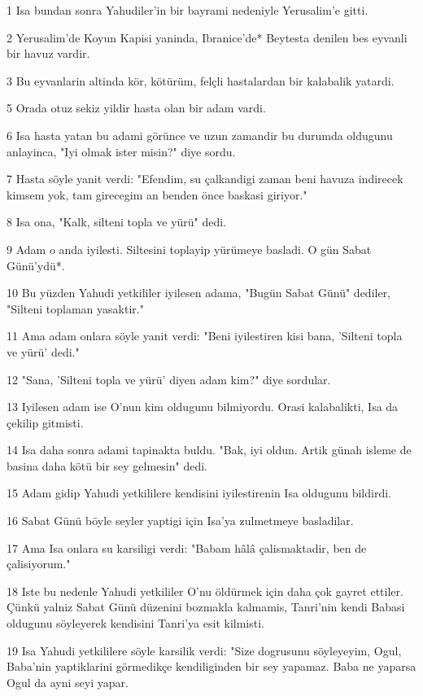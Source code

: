 \par 1 Isa bundan sonra Yahudiler'in bir bayrami nedeniyle Yerusalim'e gitti.
\par 2 Yerusalim'de Koyun Kapisi yaninda, Ibranice'de* Beytesta denilen bes eyvanli bir havuz vardir.
\par 3 Bu eyvanlarin altinda kör, kötürüm, felçli hastalardan bir kalabalik yatardi.
\par 5 Orada otuz sekiz yildir hasta olan bir adam vardi.
\par 6 Isa hasta yatan bu adami görünce ve uzun zamandir bu durumda oldugunu anlayinca, "Iyi olmak ister misin?" diye sordu.
\par 7 Hasta söyle yanit verdi: "Efendim, su çalkandigi zaman beni havuza indirecek kimsem yok, tam girecegim an benden önce baskasi giriyor."
\par 8 Isa ona, "Kalk, silteni topla ve yürü" dedi.
\par 9 Adam o anda iyilesti. Siltesini toplayip yürümeye basladi. O gün Sabat Günü'ydü*.
\par 10 Bu yüzden Yahudi yetkililer iyilesen adama, "Bugün Sabat Günü" dediler, "Silteni toplaman yasaktir."
\par 11 Ama adam onlara söyle yanit verdi: "Beni iyilestiren kisi bana, 'Silteni topla ve yürü' dedi."
\par 12 "Sana, 'Silteni topla ve yürü' diyen adam kim?" diye sordular.
\par 13 Iyilesen adam ise O'nun kim oldugunu bilmiyordu. Orasi kalabalikti, Isa da çekilip gitmisti.
\par 14 Isa daha sonra adami tapinakta buldu. "Bak, iyi oldun. Artik günah isleme de basina daha kötü bir sey gelmesin" dedi.
\par 15 Adam gidip Yahudi yetkililere kendisini iyilestirenin Isa oldugunu bildirdi.
\par 16 Sabat Günü böyle seyler yaptigi için Isa'ya zulmetmeye basladilar.
\par 17 Ama Isa onlara su karsiligi verdi: "Babam hâlâ çalismaktadir, ben de çalisiyorum."
\par 18 Iste bu nedenle Yahudi yetkililer O'nu öldürmek için daha çok gayret ettiler. Çünkü yalniz Sabat Günü düzenini bozmakla kalmamis, Tanri'nin kendi Babasi oldugunu söyleyerek kendisini Tanri'ya esit kilmisti.
\par 19 Isa Yahudi yetkililere söyle karsilik verdi: "Size dogrusunu söyleyeyim, Ogul, Baba'nin yaptiklarini görmedikçe kendiliginden bir sey yapamaz. Baba ne yaparsa Ogul da ayni seyi yapar.
